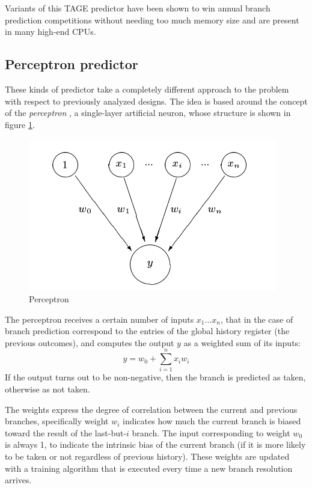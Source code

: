 Variants of this \ac{TAGE} predictor have been shown to win annual branch prediction competitions without needing too much memory size \cite[p.~189]{hennessy17} and are present in many high-end \acp{CPU}.

\subsection{Perceptron predictor}
These kinds of predictor take a completely different approach to the problem with respect to previously analyzed designs. The idea is based around the concept of the \emph{perceptron} \cite{jimenez01}, a single-layer artificial neuron, whose structure is shown in figure \ref{fig:perceptron}.
\begin{figure}[hbtp]
  \centering
  \includegraphics[width=.5\textwidth]{img/perceptron.pdf}
  \caption{Perceptron}
  \label{fig:perceptron}
\end{figure}
The perceptron receives a certain number of inputs $x_1 \ldots x_n$, that in the case of branch prediction correspond to the entries of the global history register (the previous outcomes), and computes the output $y$ as a weighted sum of its inputs:
\begin{equation*}
  y = w_0 + \sum_{i=1}^n x_i w_i
\end{equation*}
If the output turns out to be non-negative, then the branch is predicted as taken, otherwise as not taken.

The weights express the degree of correlation between the current and previous branches, specifically weight $w_i$ indicates how much the current branch is biased toward the result of the last-but-$i$ branch. The input corresponding to weight $w_0$ is always 1, to indicate the intrinsic bias of the current branch (if it is more likely to be taken or not regardless of previous history). These weights are updated with a training algorithm that is executed every time a new branch resolution arrives.

